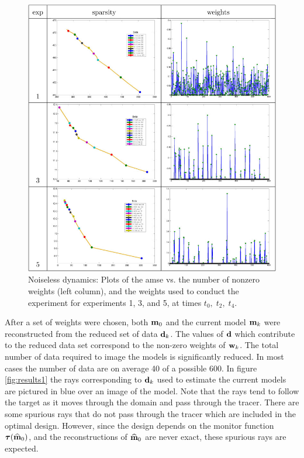 \documentclass[leqno,onefignum,onetabnum]{siamltexmm}
\newcommand{\bfd}	{{\bf{d}}}
\newcommand{\bfm}	{{\bf{m}}}
\newcommand{\bfw}	{{\bf{w}}}
\newcommand{\bftau}      {{\boldsymbol \tau}}
\newcommand{\bfmhat}    {{\widehat{\bfm}}}
\begin{document}
\begin{figure}
	\renewcommand{\arraystretch}{1.5}
	\begin{center}
		\iwidth=140mm
					\includegraphics[width=1\iwidth]{figures/risk2}
	\end{center}
	\caption{Noiseless dynamics: Plots of the amse  vs. the number of nonzero weights (left column), and the weights used to conduct the experiment for experiments 1, 3, and 5, at times $t_0,\; t_2,\; t_4$.}
	\label{fig:weights1}
\end{figure}
After a set of weights were chosen, both $\bfm_0$ and the current model $\bfm_k$ were reconstructed from the reduced set of data $\bfd_k$. The values of $\bfd$ which contribute to the reduced data set correspond to the non-zero weights of $\bfw_k$. The total number of data required to image the models is significantly reduced. In most cases the number of data are on average  40 of a possible 600.
  In figure \ref{fig:results1} the rays corresponding to $\bfd_k$ used to estimate the current models are pictured in blue over an image of the model. Note that the rays tend to follow the target as it moves through the domain and pass through the tracer.
There are some spurious rays that do not pass through the tracer which are included in the optimal design. However, since the design depends on the monitor function  $\bftau(\bfmhat_0)$, and the reconstructions of $\bfmhat_0$ are never exact,  these spurious rays are expected. 
\end{document}
